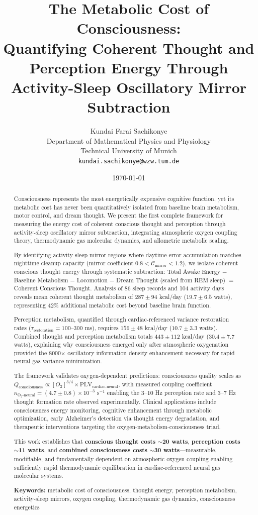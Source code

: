 \documentclass[12pt,twocolumn]{article}
\title{\textbf{The Metabolic Cost of Consciousness:\\
Quantifying Coherent Thought and Perception Energy Through\\
Activity-Sleep Oscillatory Mirror Subtraction}}
\author{
Kundai Farai Sachikonye\\
Department of Mathematical Physics and Physiology\\
Technical University of Munich\\
\texttt{kundai.sachikonye@wzw.tum.de}
}
\date{\today}
\theoremstyle{remark}
\begin{document}
\maketitle

\begin{abstract}
Consciousness represents the most energetically expensive cognitive function, yet its metabolic cost has never been quantitatively isolated from baseline brain metabolism, motor control, and dream thought. We present the first complete framework for measuring the energy cost of coherent conscious thought and perception through activity-sleep oscillatory mirror subtraction, integrating atmospheric oxygen coupling theory, thermodynamic gas molecular dynamics, and allometric metabolic scaling.

By identifying activity-sleep mirror regions where daytime error accumulation matches nighttime cleanup capacity (mirror coefficient $0.8 < \mathcal{C}_{\text{mirror}} < 1.2$), we isolate coherent conscious thought energy through systematic subtraction: Total Awake Energy $-$ Baseline Metabolism $-$ Locomotion $-$ Dream Thought (scaled from REM sleep) $=$ Coherent Conscious Thought. Analysis of 86 sleep records and 104 activity days reveals mean coherent thought metabolism of $287 \pm 94$ kcal/day ($19.7 \pm 6.5$ watts), representing 42\% additional metabolic cost beyond baseline brain function.

Perception metabolism, quantified through cardiac-referenced variance restoration rates ($\tau_{\text{restoration}} = 100$--$300$ ms), requires $156 \pm 48$ kcal/day ($10.7 \pm 3.3$ watts). Combined thought and perception metabolism totals $443 \pm 112$ kcal/day ($30.4 \pm 7.7$ watts), explaining why consciousness emerged only after atmospheric oxygenation provided the 8000$\times$ oscillatory information density enhancement necessary for rapid neural gas variance minimization.

The framework validates oxygen-dependent predictions: consciousness quality scales as $Q_{\text{consciousness}} \propto [O_2]^{3/4} \times \text{PLV}_{\text{cardiac-neural}}$, with measured coupling coefficient $\kappa_{\text{O}_2\text{-neural}} = (4.7 \pm 0.8) \times 10^{-3}$ s$^{-1}$ enabling the 3--10 Hz perception rate and 3--7 Hz thought formation rate observed experimentally. Clinical applications include consciousness energy monitoring, cognitive enhancement through metabolic optimization, early Alzheimer's detection via thought energy degradation, and therapeutic interventions targeting the oxygen-metabolism-consciousness triad.

This work establishes that \textbf{conscious thought costs $\sim$20 watts}, \textbf{perception costs $\sim$11 watts}, and \textbf{combined consciousness costs $\sim$30 watts}—measurable, modifiable, and fundamentally dependent on atmospheric oxygen coupling enabling sufficiently rapid thermodynamic equilibration in cardiac-referenced neural gas molecular systems.

\textbf{Keywords:} metabolic cost of consciousness, thought energy, perception metabolism, activity-sleep mirrors, oxygen coupling, thermodynamic gas dynamics, consciousness energetics
\end{abstract}
\end{document}
